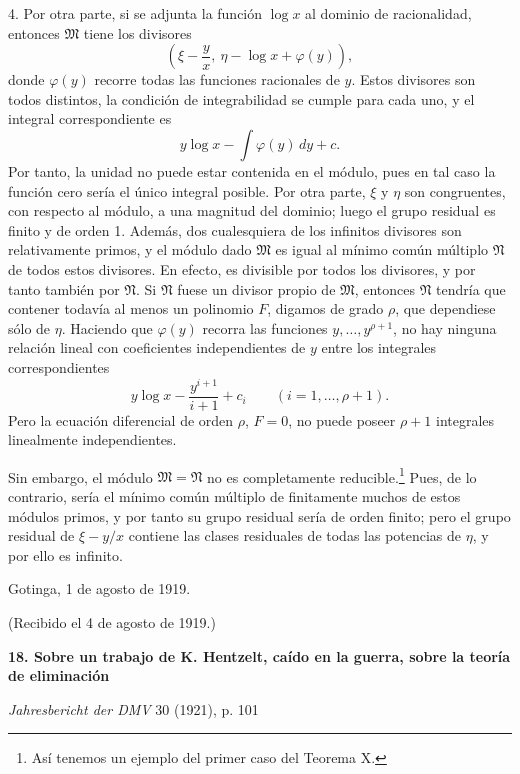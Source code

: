 \documentclass[11pt]{article}
\begin{document}
4. Por otra parte, si se adjunta la función $\log x$ al dominio de racionalidad, entonces $\mathfrak M$ tiene los divisores
\[
 \left(\xi-\frac{y}{x},\ \eta-\log x+\varphi(y)\right),
\]
donde $\varphi(y)$ recorre todas las funciones racionales de $y$. Estos divisores son todos distintos, la condición de integrabilidad se cumple para cada uno, y el integral correspondiente es
\[
 y\log x-\int\varphi(y)\,dy+c.
\]
Por tanto, la unidad no puede estar contenida en el módulo, pues en tal caso la función cero sería el único integral posible. Por otra parte, $\xi$ y $\eta$ son congruentes, con respecto al módulo, a una magnitud del dominio; luego el grupo residual es finito y de orden 1. Además, dos cualesquiera de los infinitos divisores son relativamente primos, y el módulo dado $\mathfrak M$ es igual al mínimo común múltiplo $\mathfrak N$ de todos estos divisores. En efecto, es divisible por todos los divisores, y por tanto también por $\mathfrak N$. Si $\mathfrak N$ fuese un divisor propio de $\mathfrak M$, entonces $\mathfrak N$ tendría que contener todavía al menos un polinomio $F$, digamos de grado $\rho$, que dependiese sólo de $\eta$. Haciendo que $\varphi(y)$ recorra las funciones $y,\ldots,y^{\rho+1}$, no hay ninguna relación lineal con coeficientes independientes de $y$ entre los integrales correspondientes
\[
 y\log x-\frac{y^{i+1}}{i+1}+c_i
 \qquad(i=1,
\ldots,
\rho+1).
\]
Pero la ecuación diferencial de orden $\rho$, $F=0$, no puede poseer $\rho+1$ integrales linealmente independientes.

Sin embargo, el módulo $\mathfrak M=\mathfrak N$ no es completamente reducible.\footnote{Así tenemos un ejemplo del primer caso del Teorema X.} Pues, de lo contrario, sería el mínimo común múltiplo de finitamente muchos de estos módulos primos, y por tanto su grupo residual sería de orden finito; pero el grupo residual de $\xi-y/x$ contiene las clases residuales de todas las potencias de $\eta$, y por ello es infinito.

Gotinga, 1 de agosto de 1919.

\begin{center}
(Recibido el 4 de agosto de 1919.)
\end{center}

\clearpage
\setcounter{footnote}{0}
\begin{center}
{\Large\bfseries 18. Sobre un trabajo de K. Hentzelt, caído en la guerra, sobre la teoría de eliminación}\par
\vspace{1em}
\emph{Jahresbericht der DMV} 30 (1921), p. 101
\end{center}
\end{document}
